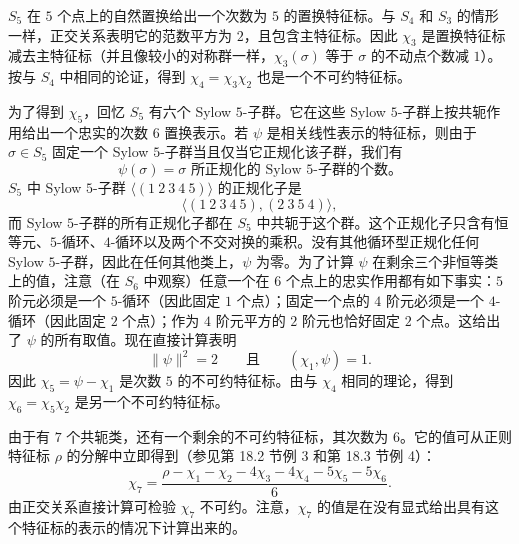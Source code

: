 $S_5$ 在 $5$ 个点上的自然置换给出一个次数为 $5$ 的置换特征标。与 $S_4$ 和 $S_3$ 的情形一样，正交关系表明它的范数平方为 $2$，且包含主特征标。因此 $\chi_3$ 是置换特征标减去主特征标（并且像较小的对称群一样，$\chi_3(\sigma)$ 等于 $\sigma$ 的不动点个数减 $1$）。按与 $S_4$ 中相同的论证，得到 $\chi_4=\chi_3\chi_2$ 也是一个不可约特征标。

为了得到 $\chi_5$，回忆 $S_5$ 有六个 Sylow $5$-子群。它在这些 Sylow $5$-子群上按共轭作用给出一个忠实的次数 $6$ 置换表示。若 $\psi$ 是相关线性表示的特征标，则由于 $\sigma\in S_5$ 固定一个 Sylow $5$-子群当且仅当它正规化该子群，我们有
\[
  \psi(\sigma)=\sigma\text{ 所正规化的 Sylow }5\text{-子群的个数。}
\]
$S_5$ 中 Sylow $5$-子群 $\langle(1\ 2\ 3\ 4\ 5)\rangle$ 的正规化子是
\[
  \langle (1\ 2\ 3\ 4\ 5),(2\ 3\ 5\ 4)\rangle,
\]
而 Sylow $5$-子群的所有正规化子都在 $S_5$ 中共轭于这个群。这个正规化子只含有恒等元、$5$-循环、$4$-循环以及两个不交对换的乘积。没有其他循环型正规化任何 Sylow $5$-子群，因此在任何其他类上，$\psi$ 为零。为了计算 $\psi$ 在剩余三个非恒等类上的值，注意（在 $S_6$ 中观察）任意一个在 $6$ 个点上的忠实作用都有如下事实：$5$ 阶元必须是一个 $5$-循环（因此固定 $1$ 个点）；固定一个点的 $4$ 阶元必须是一个 $4$-循环（因此固定 $2$ 个点）；作为 $4$ 阶元平方的 $2$ 阶元也恰好固定 $2$ 个点。这给出了 $\psi$ 的所有取值。现在直接计算表明
\[
  \|\psi\|^2=2\qquad\text{且}\qquad (\chi_1,\psi)=1.
\]
因此 $\chi_5=\psi-\chi_1$ 是次数 $5$ 的不可约特征标。由与 $\chi_4$ 相同的理论，得到 $\chi_6=\chi_5\chi_2$ 是另一个不可约特征标。

由于有 $7$ 个共轭类，还有一个剩余的不可约特征标，其次数为 $6$。它的值可从正则特征标 $\rho$ 的分解中立即得到（参见第 18.2 节例 3 和第 18.3 节例 4）：
\[
  \chi_7=\frac{\rho-\chi_1-\chi_2-4\chi_3-4\chi_4-5\chi_5-5\chi_6}{6}.
\]
由正交关系直接计算可检验 $\chi_7$ 不可约。注意，$\chi_7$ 的值是在没有显式给出具有这个特征标的表示的情况下计算出来的。

